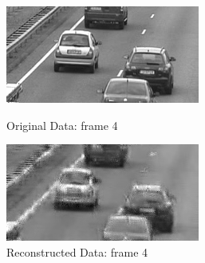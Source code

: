 \documentclass[12pt]{article}
\begin{document}
\begin{itemize}
\begin{enumerate}
    \begin{figure}[H]
        \centering
        \begin{minipage}{.45\textwidth}
            \centering
            \includegraphics[width=\linewidth]{results/cars_5_orig_4.png}
            \caption*{Original Data: frame 4}
        \end{minipage}
        \begin{minipage}{.45\textwidth}
            \centering
            \includegraphics[width=\linewidth]{results/cars_5_recon_4.png}
            \caption*{Reconstructed Data: frame 4}
        \end{minipage}
    \end{figure}



\end{enumerate}
\end{itemize}
\end{document}
